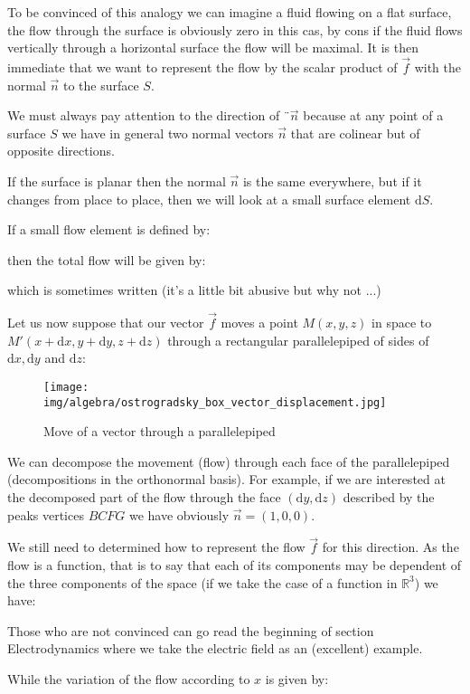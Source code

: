 	To be convinced of this analogy we can imagine a fluid flowing on a flat surface, the flow through the surface is obviously zero in this cas, by cons if the fluid flows vertically through a horizontal surface the flow will be maximal. It is then immediate that we want to represent the flow by the scalar product of $\vec{f}$ with the normal $\vec{n}$ to  the surface $S$.
	\begin{tcolorbox}[title=Remark,colframe=black,arc=10pt]
	We must always pay attention to the direction of $¨\vec{n}$ because at any point of a surface $S$ we have in general two normal vectors $\vec{n}$ that are colinear but of opposite directions.
	\end{tcolorbox}	
	If the surface is planar  then the normal $\vec{n}$ is the same everywhere, but if it changes from place to place, then we will look at a small surface element $\mathrm{d}S$.
	
	If a small flow element is defined by:
	
	then the total flow will be given by:
	
	which is sometimes written (it's a little bit abusive but why not ...)
	
	Let us now suppose that our vector $\vec{f}$ moves a point $M(x,y,z)$ in space to  $M'(x+\mathrm{d}x,y+\mathrm{d}y,z+\mathrm{d}z)$ through a rectangular parallelepiped of sides of $\mathrm{d}x, \mathrm{d}y$ and $\mathrm{d}z$:
	
	\begin{figure}[H]
		\centering
		\texttt{[image: img/algebra/ostrogradsky\_box\_vector\_displacement.jpg]}
		\caption[]{Move of a vector through a parallelepiped}
	\end{figure}
	We can decompose the movement (flow) through each face of the parallelepiped (decompositions in the orthonormal basis). For example, if we are interested at the decomposed part of the flow through the face $(\mathrm{d}y, \mathrm{d}z)$ described by the peaks vertices $BCFG$ we have obviously $\vec{n}=(1,0,0)$.
	
	We still need to determined how to represent the flow $\vec{f}$ for this direction. As the flow is a function, that is to say that each of its components may be dependent of the three components of the space (if we take the case of a function in $\mathbb{R}^3$) we have:
	
	\begin{tcolorbox}[title=Remark,colframe=black,arc=10pt]
	Those who are not convinced can go read the beginning of section Electrodynamics where we take the electric field as an (excellent) example.
	\end{tcolorbox}	
	While the variation of the flow according to $x$ is given by:
	

